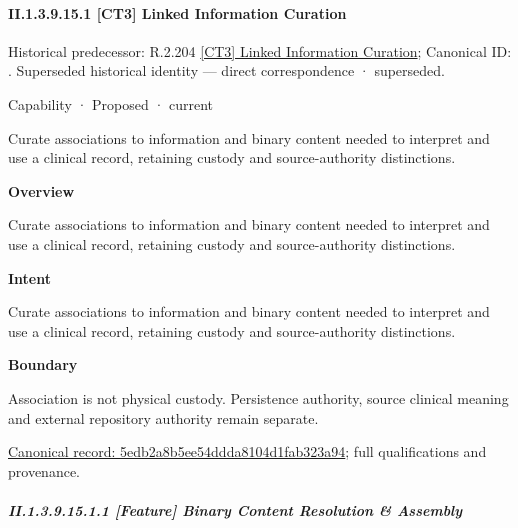 \paragraph*{II.1.3.9.15.1 [CT3] Linked Information Curation}
\label{navigation:II.1.3.9.15.1}

{\small Historical predecessor: R.2.204 \hyperref[element:9d0925bb39664a5985cacf3cea7442d1]{[CT3] Linked Information Curation}; Canonical ID: \texttt{}. Superseded historical identity — direct correspondence · superseded.}\par
\label{element:5edb2a8b5ee54ddda8104d1fab323a94}
{\small Capability · Proposed · current}\par

Curate associations to information and binary content needed to interpret and use a clinical record, retaining custody and source-authority distinctions.



\textbf{Overview}



Curate associations to information and binary content needed to interpret and use a clinical record, retaining custody and source-authority distinctions.



\textbf{Intent}



Curate associations to information and binary content needed to interpret and use a clinical record, retaining custody and source-authority distinctions.



\textbf{Boundary}



Association is not physical custody. Persistence authority, source clinical meaning and external repository authority remain separate.


{\footnotesize \href{../../../../continuum/strategy/capability/5edb2a8b5ee54ddda8104d1fab323a94.md}{Canonical record: 5edb2a8b5ee54ddda8104d1fab323a94}; full qualifications and provenance.}\par
\subparagraph*{II.1.3.9.15.1.1 [Feature] Binary Content Resolution \& Assembly}
\label{navigation:II.1.3.9.15.1.1}

